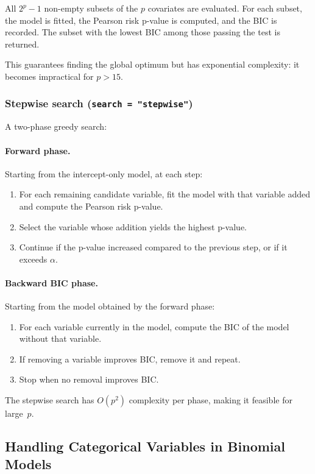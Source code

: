 \documentclass[11pt,a4paper]{article}
\begin{document}
All $2^p - 1$ non-empty subsets of the $p$ covariates are evaluated. For each subset, the model is fitted, the Pearson risk p-value is computed, and the BIC is recorded. The subset with the lowest BIC among those passing the test is returned.

This guarantees finding the global optimum but has exponential complexity: it becomes impractical for $p > 15$.

\subsubsection{Stepwise search (\texttt{search = "stepwise"})}

A two-phase greedy search:

\paragraph{Forward phase.} Starting from the intercept-only model, at each step:
\begin{enumerate}
    \item For each remaining candidate variable, fit the model with that variable added and compute the Pearson risk p-value.
    \item Select the variable whose addition yields the highest p-value.
    \item Continue if the p-value increased compared to the previous step, or if it exceeds $\alpha$.
\end{enumerate}

\paragraph{Backward BIC phase.} Starting from the model obtained by the forward phase:
\begin{enumerate}
    \item For each variable currently in the model, compute the BIC of the model without that variable.
    \item If removing a variable improves BIC, remove it and repeat.
    \item Stop when no removal improves BIC.
\end{enumerate}

The stepwise search has $O(p^2)$ complexity per phase, making it feasible for large~$p$.

\subsection{Handling Categorical Variables in Binomial Models}
\end{document}
